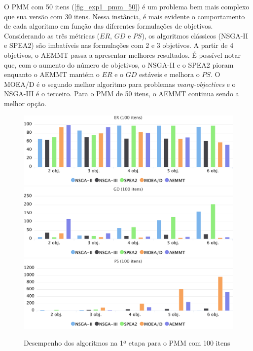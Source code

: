 O PMM com 50 itens (\autoref{fig_exp1_pmm_50}) é um problema bem mais complexo que sua versão com 30 itens. Nessa instância, é mais evidente  o comportamento de cada algoritmo em função das diferentes formulações de objetivos. Considerando as três métricas ($ER$, $GD$ e $PS$), os algoritmos clássicos (NSGA-II e SPEA2) são imbatíveis nas formulações com 2 e 3 objetivos. A partir de 4 objetivos, o AEMMT passa a apresentar melhores resultados. É possível notar que, com o aumento do número de objetivos, o NSGA-II e o SPEA2 pioram enquanto o AEMMT mantém o $ER$ e o $GD$ estáveis e melhora o $PS$. O MOEA/D é o segundo melhor algoritmo para problemas \textit{many-objectives} e o NSGA-III é o terceiro. Para o PMM de 50 itens, o AEMMT continua sendo a melhor opção.

\begin{figure}[!htbp]
	\includegraphics[width=1\textwidth]{cap_experimentos/figs/etapa1/er-mkp-100}
	\includegraphics[width=1\textwidth]{cap_experimentos/figs/etapa1/gd-mkp-100}
	\includegraphics[width=1\textwidth]{cap_experimentos/figs/etapa1/ps-mkp-100}
	\caption{\label{fig_exp1_pmm_100}Desempenho dos algoritmos na 1ª etapa para o PMM com 100 itens}
\end{figure}

